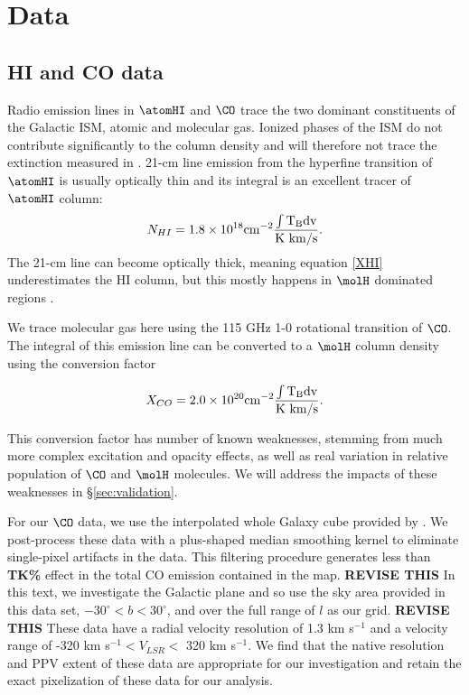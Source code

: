 \section{Data}
\label{sec:data}
\subsection{HI and CO data}

Radio emission lines in $\atomHI$ and $\CO$ trace the two dominant constituents of the Galactic ISM, atomic and molecular gas. 
Ionized phases of the ISM do not contribute significantly to the column density and will therefore not trace the extinction measured in \citet{Green_2015}. 
21-cm line emission from the hyperfine transition of $\atomHI$ is usually optically thin and its integral is an excellent tracer of $\atomHI$ column:
\begin{equation}\label{XHI}
N_{HI} = 1.8 \times 10^{18} \rm cm^{-2} \frac{ \int T_B dv}{\rm K~km/s}.
\end{equation}
The 21-cm line can become optically thick, meaning equation \ref{XHI} underestimates the HI column, but this mostly happens in $\molH$ dominated regions \citep{Goldsmith_2007}. 

We trace molecular gas here using the 115 GHz 1-0 rotational transition of $\CO$. 
The integral of this emission line can be converted to a $\molH$ column density using the conversion factor \citep{Bolatto_2013}

\begin{equation}\label{XCO}
X_{CO} = 2.0 \times 10^{20} \rm cm^{-2} \frac{ \int T_B dv}{\rm K~km/s}.
\end{equation}

This conversion factor has number of known weaknesses, stemming from much more complex excitation and opacity effects, as well as real variation in relative population of $\CO$ and $\molH$ molecules. 
We will address the impacts of these weaknesses in \S \ref{sec:validation}. 

For our $\CO$ data, we use the interpolated whole Galaxy cube provided by \citet{Dame_2001}. 
We post-process these data with a plus-shaped median smoothing kernel to eliminate single-pixel artifacts in the data. 
This filtering procedure generates less than {\bf TK\%} effect in the total CO emission contained in the map. 
{\bf REVISE THIS} In this text, we investigate the Galactic plane and so use the sky area provided in this data set, $-30^\circ < b < 30^\circ$, and over the full range of $l$ as our grid. {\bf REVISE THIS}
These data have a radial velocity resolution of 1.3 km s$^{-1}$ and a velocity range of -320 km s$^{-1} < V_{LSR} <$ 320 km s$^{-1}$. 
We find that the native resolution and PPV extent of these data are appropriate for our investigation and retain the exact pixelization of these data for our analysis. 

